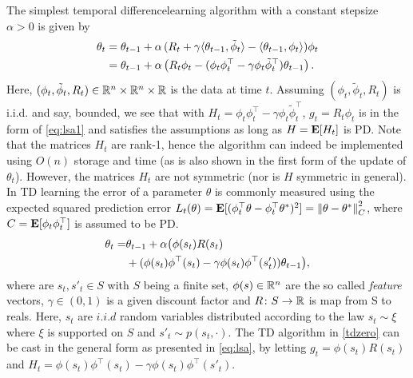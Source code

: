 \begin{example}
The simplest temporal differencelearning algorithm with a constant stepsize $\alpha>0$ is given by
\begin{align}
\label{tdzero}
\begin{split}
\theta_t
& = \theta_{t-1}+\alpha\, (R_t+ \gamma \langle\theta_{t-1},\tilde{\phi}_t \rangle - \langle\theta_{t-1},\phi_t\rangle)\phi_t \\
& = \theta_{t-1}+\alpha\, \bigl( R_t\phi_t- (\phi_t \phi_t^\top-\gamma \phi_t \tilde{\phi}_t^\top)\theta_{t-1}\bigr)\,.
\end{split}
\end{align}
Here, $(\phi_t,\tilde{\phi}_t,R_t)\in \mathbb{R}^n\times \mathbb{R}^n \times \mathbb{R}$ is the data at time $t$.
Assuming $(\phi_t,\tilde{\phi}_t,R_t)$ is i.i.d. and say, bounded, 
we see that with $H_t = \phi_t \phi_t^\top-\gamma \phi_t \tilde{\phi}_t^\top$, $g_t = R_t \phi_t$ is in the form of 
\eqref{eq:lsa1} and satisfies the assumptions as long as $H = \mathbf{E}[H_t]$ is PD. 
Note that the matrices $H_t$ are rank-1, hence the algorithm can indeed be implemented using $O(n)$ storage and
time (as is also shown in the first form of the update of $\theta_t$).
However, the matrices $H_t$ are not symmetric (nor is $H$ symmetric in general).
In TD learning the error of a parameter $\theta$ is commonly measured using the expected squared 
prediction error $L_t(\theta) = \mathbf{E}[ (\phi_t^\top \theta - \phi_t^\top \theta^*)^2 ] = \left\| \theta - \theta^*\right\|_C^2$,
where $C = \mathbf{E}[ \phi_t \phi_t^\top ]$ is assumed to be PD.
\begin{align}\label{tdzero}
\theta_t=&\theta_{t-1}+\alpha \big(\phi(s_t) R(s_t)\nonumber\\&+ (\phi(s_t)\phi^\top(s_t)-\gamma \phi(s_t)\phi^\top(s'_t))\theta_{t-1}\big),
\end{align}
where are $s_t,s'_t\in S$ with $S$ being a finite set, $\phi(s)\in \mathbb{R}^n$ are the so called \emph{feature} vectors, $\gamma\in (0,1)$ is a given discount factor and $R\colon S\rightarrow \mathbb{R}$ is map from S to reals. 
Here, $s_t$ are $i.i.d$ random variables distributed according to the law $s_t\sim \xi$ where $\xi$ is supported on $S$ and $s'_t\sim p(s_t,\cdot)$. The TD algorithm in \eqref{tdzero} can be cast in the general form as presented in \eqref{eq:lsa}, by letting $g_t=\phi(s_t)R(s_t)$ and $H_t=\phi(s_t)\phi^\top(s_t)-\gamma \phi(s_t)\phi^\top(s'_t)$.
\fi
\end{example}
